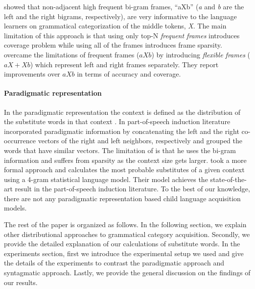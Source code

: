 \cite{Mintz200391} showed that non-adjacent high frequent bi-gram frames,
``aXb'' ({\it a} and {\it b} are the left and the right bigrams, respectively),
are very informative to the language learners on grammatical categorization of
the middle tokens, {\it X}.  The main limitation of this approach is that using
only top-N {\it frequent frames} introduces coverage problem while using all of
the frames introduces frame sparsity.  \cite{clair2010} overcame the
limitations of frequent frames ($aXb$) by introducing {\it flexible frames}
($aX+Xb$) which represent left and right frames separately.  They report
improvements over $aXb$ in terms of accuracy and coverage.  

\paragraph {Paradigmatic representation}

In the paradigmatic representation the context is defined as the distribution
of the substitute words in that context \citep*{SchutzePe93, Schutze1995,
YatbazSY12}.   In part-of-speech induction literature \cite{Schutze1995}
incorporated paradigmatic information by concatenating the left and the right
co-occurrence vectors of the right and left neighbors, respectively and grouped
the words that have similar vectors.  The limitation of \cite{Schutze1995} is
that he uses the bi-gram information and suffers from sparsity as the context
size gets larger.  \cite{YatbazSY12} took a more formal approach and
calculates the most probable substitutes of a given context using a 4-gram
statistical language model.  Their model achieves the state-of-the-art result
in the part-of-speech induction literature.  To the best of our knowledge,
there are not any paradigmatic representation based child language acquisition
models.  


The rest of the paper is organized as follows. In the following section, we explain other
distributional approaches to grammatical category acquisition. Secondly, we provide
the detailed explanation of our calculations of substitute words. In the experiments section,
first we introduce the experimental setup we used and give the details of the experiments
to contrast the paradigmatic approach and syntagmatic approach. Lastly, we provide the
general discussion on the findings of our results. 
